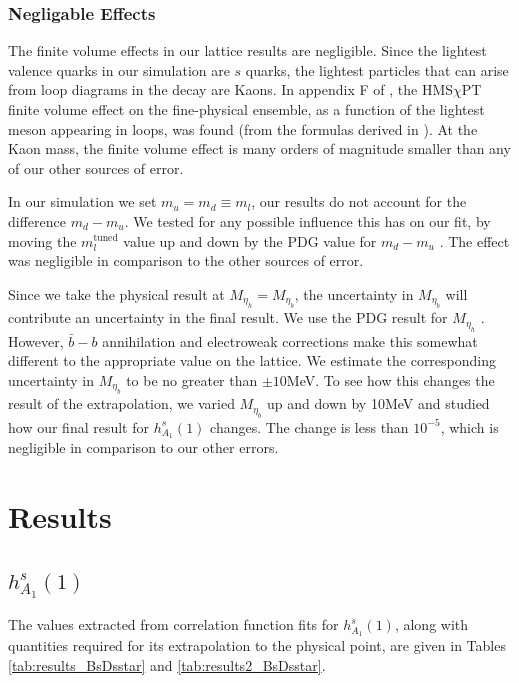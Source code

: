 \subsubsection{Negligable Effects}

The finite volume effects in our lattice results are negligible. Since the lightest valence quarks in our simulation are $s$ quarks, the lightest particles that can arise from loop diagrams in the decay are Kaons. In appendix F of \cite{Harrison:2017fmw}, the HMS$\chi$PT finite volume effect on the fine-physical ensemble, as a function of the lightest meson appearing in loops, was found (from the formulas derived in \cite{Laiho:2005ue}). At the Kaon mass, the finite volume effect is many orders of magnitude smaller than any of our other sources of error. 

In our simulation we set $m_u=m_d\equiv m_l$, our results do not account for the difference $m_d-m_u$. We tested for any possible influence this has on our fit, by moving the $m_l^{\text{tuned}}$ value up and down by the PDG value for $m_d-m_u$ \cite{PhysRevD.98.030001}. The effect was negligible in comparison to the other sources of error.

Since we take the physical result at $M_{\eta_h}=M_{\eta_b}$, the uncertainty in $M_{\eta_b}$ will contribute an uncertainty in the final result. We use the PDG result for $M_{\eta_h}$ \cite{PhysRevD.98.030001}. However, $\bar{b}-b$ annihilation and electroweak corrections make this somewhat different to the appropriate value on the lattice. We estimate the corresponding uncertainty in $M_{\eta_b}$ to be no greater than $\pm10$MeV. To see how this changes the result of the extrapolation, we varied $M_{\eta_b}$ up and down by 10MeV and studied how our final result for $h_{A_1}^s(1)$ changes. The change is less than $10^{-5}$, which is negligible in comparison to our other errors.

\section{Results}
\label{sec:results_BsDsstar}

\subsection{$h^s_{A_1}(1)$}

The values extracted from correlation function fits for $h^s_{A_1}(1)$, along with quantities required for its extrapolation to the physical point, are given in Tables \ref{tab:results_BsDsstar} and \ref{tab:results2_BsDsstar}.

